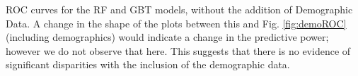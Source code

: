ROC curves for the RF and GBT models, without the addition of Demographic Data. A change in the shape of the plots between this and Fig. \ref{fig:demoROC} (including demographics) would indicate a change in the predictive power; however we do not observe that here. This suggests that there is no evidence of significant disparities with the inclusion of the demographic data.
\label{fig:nodemoROC}